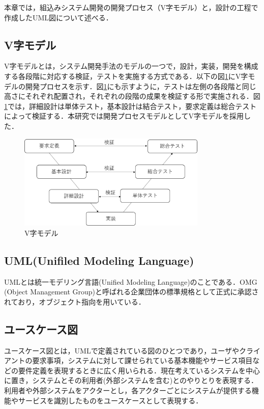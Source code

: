 
本章では，組込みシステム開発の開発プロセス（V字モデル）と，設計の工程で作成したUML図について述べる．

\subsection*{V字モデル\cite{vji}}

V字モデルとは，システム開発手法のモデルの一つで，設計，実装，開発を構成する各段階に対応する検証，テストを実施する方式である．以下の図\ref{vji}にV字モデルの開発プロセスを示す．図\ref{vji}にも示すように，テストは左側の各段階と同じ高さにそれぞれ配置され，それぞれの段階の成果を検証する形で実施される．図\ref{vji}では，詳細設計は単体テスト，基本設計は結合テスト，要求定義は総合テストによって検証する．本研究では開発プロセスモデルとしてV字モデルを採用した．

\begin{figure}[htbp]
	\centering
	\includegraphics[width=9cm]{./vmodel2.eps}
	\caption{V字モデル}
	\label{vji}
\end{figure}


\subsection*{UML(Unifiled Modeling Language)\cite{uml}}

UMLとは統一モデリング言語(Unified Modeling Language)のことである．OMG\\(Object Management Group)と呼ばれる企業団体の標準規格として正式に承認されており，オブジェクト指向を用いている．

\subsection*{ユースケース図\cite{uml}}

ユースケース図とは，UMLで定義されている図のひとつであり，ユーザやクライアントの要求事項，システムに対して課せられている基本機能やサービス項目などの要件定義を表現するときに広く用いられる．現在考えているシステムを中心に置き，システムとその利用者(外部システムを含む)とのやりとりを表現する．利用者や外部システムをアクターとし，各アクターごとにシステムが提供する機能やサービスを識別したものをユースケースとして表現する．

